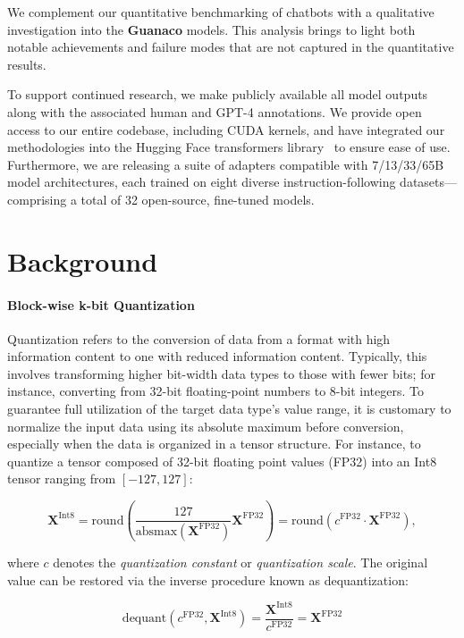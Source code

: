 We complement our quantitative benchmarking of chatbots with a qualitative investigation into the \textbf{Guanaco} models. This analysis brings to light both notable achievements and failure modes that are not captured in the quantitative results.

To support continued research, we make publicly available all model outputs along with the associated human and GPT-4 annotations. We provide open access to our entire codebase, including CUDA kernels, and have integrated our methodologies into the Hugging Face transformers library~\citep{wolf2019huggingface} to ensure ease of use. Furthermore, we are releasing a suite of adapters compatible with 7/13/33/65B model architectures, each trained on eight diverse instruction-following datasets—comprising a total of 32 open-source, fine-tuned models.

\section{Background}
\paragraph{Block-wise k-bit Quantization} Quantization refers to the conversion of data from a format with high information content to one with reduced information content. Typically, this involves transforming higher bit-width data types to those with fewer bits; for instance, converting from 32-bit floating-point numbers to 8-bit integers. To guarantee full utilization of the target data type's value range, it is customary to normalize the input data using its absolute maximum before conversion, especially when the data is organized in a tensor structure. For instance, to quantize a tensor composed of 32-bit floating point values (FP32) into an Int8 tensor ranging from $[-127, 127]$:

\begin{equation}
    \mathbf{X}^{ \text{Int8}} = \text{round}\left( \frac{127}{{\text{absmax}}(\mathbf{X}^{{\text{FP32}}})}\mathbf{X}^{{\text{FP32}}} \right) = \text{round}(c^{\text{FP32}}\cdot \mathbf{X}^{{\text{FP32}}}),
\end{equation}

where $c$ denotes the {\em quantization constant} or {\em quantization scale}. The original value can be restored via the inverse procedure known as dequantization:

\begin{equation}
    \text{dequant}(c^{\text{FP32}}, \mathbf{X}^{\text{Int8}}) = \frac{\mathbf{X}^{\text{Int8}}}{c^{\text{FP32}}} = \mathbf{X}^{\text{FP32}}
\end{equation}

